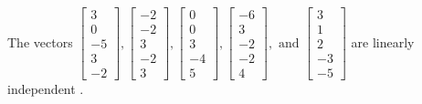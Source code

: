 \begin{exercise}
\begin{exerciseStatement}
  \end{exerciseStatement}
  \begin{exerciseAnswer}
   The vectors \(\left[\begin{array}{r}
3 \\
0 \\
-5 \\
3 \\
-2
\end{array}\right] , \left[\begin{array}{r}
-2 \\
-2 \\
3 \\
-2 \\
3
\end{array}\right] , \left[\begin{array}{r}
0 \\
0 \\
3 \\
-4 \\
5
\end{array}\right] , \left[\begin{array}{r}
-6 \\
3 \\
-2 \\
-2 \\
4
\end{array}\right] , \text{ and } \left[\begin{array}{r}
3 \\
1 \\
2 \\
-3 \\
-5
\end{array}\right]\) are 
  	 linearly independent  .
  


  \end{exerciseAnswer}
\end{exercise}